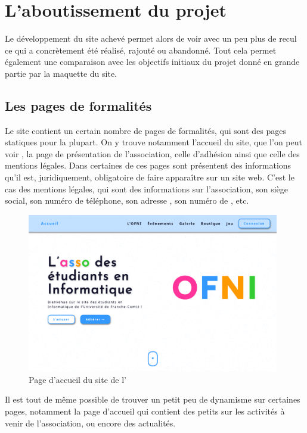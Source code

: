 \chapter{L'aboutissement du projet}
\label{chap:aboutissement}

Le développement du site achevé permet alors de voir avec un peu plus de recul ce qui a concrètement été réalisé, rajouté ou abandonné. Tout cela permet également une comparaison avec les objectifs initiaux du projet donné en grande partie par la maquette du site.

\section{Les pages de formalités}
\label{sec:pages-formalites}

Le site contient un certain nombre de pages de formalités, qui sont des pages statiques pour la plupart. On y trouve notamment l'accueil du site, que l'on peut voir , la page de présentation de l'association, celle d'adhésion ainsi que celle des mentions légales. Dans certaines de ces pages sont présentent des informations qu'il est, juridiquement, obligatoire de faire apparaître sur un site web. C'est le cas des mentions légales, qui sont des informations sur l'association, son siège social, son numéro de téléphone, son adresse , son numéro de , etc.
\bigskip

\begin{figure}[h]
    \centering
    \includegraphics[width=11cm]{assets/pictures/home-page.png}
    \caption{Page d'accueil du site de l'\ofni}
    \label{fig:home-page}
\end{figure}
\bigskip

Il est tout de même possible de trouver un petit peu de dynamisme sur certaines pages, notamment la page d'accueil qui contient des petits  sur les activités à venir de l'association, ou encore des actualités.

